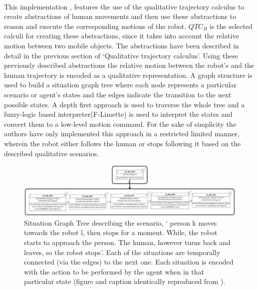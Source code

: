 	 \paragraph{}This implementation \cite{bellotto2012robot}, features the use of the qualitative trajectory calculus to create abstractions of human movements and then use these abstractions to reason and execute the corresponding motions of the robot. $QTC_B$ is the selected calculi for creating these abstractions, since it takes into account the relative motion between two mobile objects. The abstractions have been described in detail in the previous section of `Qualitative trajectory calculus'. Using these previously described abstractions the relative motion between the robot's and the human trajectory is encoded as a qualitative representation. A graph structure is used to build a situation graph tree where each node represents a particular scenario or agent's states and the edges indicate the transition to the next possible states. A depth first approach is used to traverse the whole tree and a fuzzy-logic based interpreter(F-Limette) is used to  interpret the states and convert them to a low-level motion command. For the sake of simplicity the authors have only implemented this approach in a restricted limited manner, wherein the robot either follows the human or stops following it based on the described qualitative scenarios.
	\begin{figure}[h]
		\centering
		\includegraphics[scale = 0.6]{images/graph}
		\caption{Situation Graph Tree describing the scenario, ` person k moves towards the robot l,	then stops for a moment. While, the robot starts to approach the person. The human, however turns back and leaves, so the robot stops'. Each of the situations are temporally connected (via the edges) to the next one. Each situation is encoded with the action to be performed by the agent when in that particular state (figure and caption identically reproduced from \cite{bellotto2012robot}).}
		\label{fig:graph}
	\end{figure}
	
